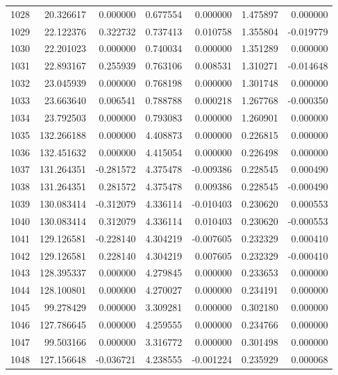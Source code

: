 \begin{tabular}{rrrrrrr}
1028 &  20.326617 &    0.000000 &  0.677554 &    0.000000 &    1.475897 &  0.000000 \\
1029 &  22.122376 &    0.322732 &  0.737413 &    0.010758 &    1.355804 & -0.019779 \\
1030 &  22.201023 &    0.000000 &  0.740034 &    0.000000 &    1.351289 &  0.000000 \\
1031 &  22.893167 &    0.255939 &  0.763106 &    0.008531 &    1.310271 & -0.014648 \\
1032 &  23.045939 &    0.000000 &  0.768198 &    0.000000 &    1.301748 &  0.000000 \\
1033 &  23.663640 &    0.006541 &  0.788788 &    0.000218 &    1.267768 & -0.000350 \\
1034 &  23.792503 &    0.000000 &  0.793083 &    0.000000 &    1.260901 &  0.000000 \\
1035 & 132.266188 &    0.000000 &  4.408873 &    0.000000 &    0.226815 &  0.000000 \\
1036 & 132.451632 &    0.000000 &  4.415054 &    0.000000 &    0.226498 &  0.000000 \\
1037 & 131.264351 &   -0.281572 &  4.375478 &   -0.009386 &    0.228545 &  0.000490 \\
1038 & 131.264351 &    0.281572 &  4.375478 &    0.009386 &    0.228545 & -0.000490 \\
1039 & 130.083414 &   -0.312079 &  4.336114 &   -0.010403 &    0.230620 &  0.000553 \\
1040 & 130.083414 &    0.312079 &  4.336114 &    0.010403 &    0.230620 & -0.000553 \\
1041 & 129.126581 &   -0.228140 &  4.304219 &   -0.007605 &    0.232329 &  0.000410 \\
1042 & 129.126581 &    0.228140 &  4.304219 &    0.007605 &    0.232329 & -0.000410 \\
1043 & 128.395337 &    0.000000 &  4.279845 &    0.000000 &    0.233653 &  0.000000 \\
1044 & 128.100801 &    0.000000 &  4.270027 &    0.000000 &    0.234191 &  0.000000 \\
1045 &  99.278429 &    0.000000 &  3.309281 &    0.000000 &    0.302180 &  0.000000 \\
1046 & 127.786645 &    0.000000 &  4.259555 &    0.000000 &    0.234766 &  0.000000 \\
1047 &  99.503166 &    0.000000 &  3.316772 &    0.000000 &    0.301498 &  0.000000 \\
1048 & 127.156648 &   -0.036721 &  4.238555 &   -0.001224 &    0.235929 &  0.000068 \\

\end{tabular}
